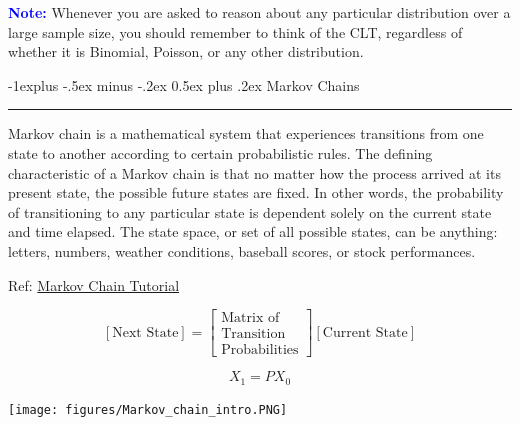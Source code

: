 \documentclass[letterpaper, 10.5pt,landscape]{article}
\makeatletter
\renewcommand{\subsection}{\@startsection{subsection}{2}{0mm}%
                                {-1explus -.5ex minus -.2ex}%
                                {0.5ex plus .2ex}%
                                {\normalfont\normalsize\bfseries}}
\makeatother
\begin{document}
\begin{multicols*}{3}
\textbf{\textcolor{blue}{Note:}} Whenever you are asked to reason about any particular distribution over a large sample size, you should remember to think of the CLT, regardless of whether it is Binomial, Poisson, or any other distribution.



\subsection{Markov Chains} {\color{teal}\hrule height 0.5pt} \smallskip
 Markov chain is a mathematical system that experiences transitions from one state to another according to certain probabilistic rules. The defining characteristic of a Markov chain is that no matter how the process arrived at its present state, the possible future states are fixed. In other words, the probability of transitioning to any particular state is dependent solely on the current state and time elapsed. The state space, or set of all possible states, can be anything: letters, numbers, weather conditions, baseball scores, or stock performances.


Ref: \href{https://www.youtube.com/playlist?list=PLX2gX-ftPVXWgcF0WATMDr-AfvfaYjJZ3}{Markov Chain Tutorial}

\vspace{-3pt}
\[\boxed{\left[\text{Next State}\right] = 
\begin{bmatrix}
\text{Matrix of}\\
\text{Transition}  \\
\text{Probabilities}
\end{bmatrix}
\left[\text{Current State} \right]
}\]

\[X_{1} = PX_{0}\]

\vspace{-3pt}
\begin{center}
    \begin{minipage}{0.6\linewidth}
    \texttt{[image: figures/Markov\_chain\_intro.PNG]}
    \end{minipage}
\end{center}



\end{multicols*}
\end{document}
